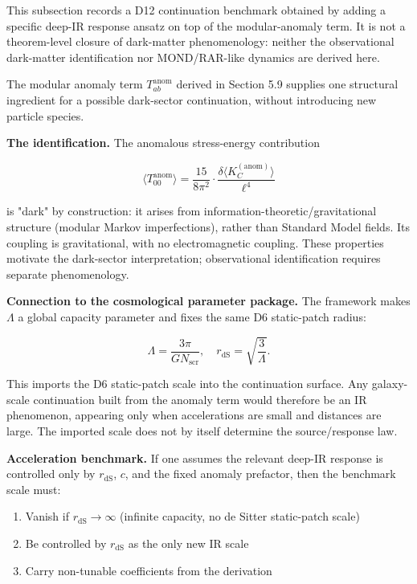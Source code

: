This subsection records a D12 continuation benchmark obtained by adding a specific deep-IR response ansatz on top of the modular-anomaly term. It is not a theorem-level closure of dark-matter phenomenology: neither the observational dark-matter identification nor MOND/RAR-like dynamics are derived here.

The modular anomaly term \(T_{ab}^{\mathrm{anom}}\) derived in Section 5.9 supplies one structural ingredient for a possible dark-sector continuation, without introducing new particle species.

\textbf{The identification.} The anomalous stress-energy contribution

\[
\langle T_{00}^{\mathrm{anom}} \rangle
= \frac{15}{8\pi^2} \cdot \frac{\delta \langle K_C^{\mathrm{(anom)}} \rangle}{\ell^4}
\]

is "dark" by construction: it arises from information-theoretic/gravitational structure (modular Markov imperfections), rather than Standard Model fields. Its coupling is gravitational, with no electromagnetic coupling. These properties motivate the dark-sector interpretation; observational identification requires separate phenomenology.

\textbf{Connection to the cosmological parameter package.} The framework makes \(\Lambda\) a global capacity parameter and fixes the same D6 static-patch radius:

\[
\Lambda = \frac{3\pi}{G N_{\mathrm{scr}}},
\quad
r_{\mathrm{dS}} = \sqrt{\frac{3}{\Lambda}}.
\]

This imports the D6 static-patch scale into the continuation surface. Any galaxy-scale continuation built from the anomaly term would therefore be an IR phenomenon, appearing only when accelerations are small and distances are large. The imported scale does not by itself determine the source/response law.

\textbf{Acceleration benchmark.} If one assumes the relevant deep-IR response is controlled only by \(r_{\mathrm{dS}}\), \(c\), and the fixed anomaly prefactor, then the benchmark scale must:

\begin{enumerate}
\def\labelenumi{\arabic{enumi}.}
\tightlist
\item
  Vanish if \(r_{\mathrm{dS}} \to \infty\) (infinite capacity, no de Sitter static-patch scale)
\item
  Be controlled by \(r_{\mathrm{dS}}\) as the only new IR scale
\item
  Carry non-tunable coefficients from the derivation
\end{enumerate}


